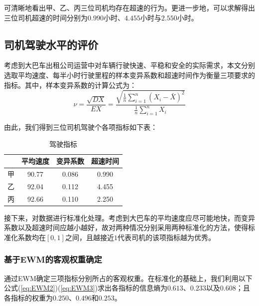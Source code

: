 \documentclass[bwprint]{cumcmthesis}
\begin{document}
        可清晰地看出甲、乙、丙三位司机均存在超速的行为。更进一步地，可以求解得出三位司机超速的时间分别为$0.990$小时、$4.455$小时与$2.550$小时。

        \subsection{司机驾驶水平的评价}
        考虑到大巴车出租公司运营中对车辆行驶快速、平稳和安全的实际需求，本文分别选取平均速度、每半小时行驶里程的样本变异系数和超速时间作为衡量三项要求的指标。其中，样本变异系数的计算公式为：
        \begin{equation*}
            \nu = \frac{\sqrt{DX}}{EX} = \frac{\sqrt{\frac{1}{n}\sum_{i=1}^{n}\left(X_i-\bar{X}\right)^2}}{\frac{1}{n}\sum_{i=1}^{n}X_i}
        \end{equation*}

        由此，我们得到三位司机驾驶个各项指标如下表：
        
        \begin{table}[htbp]
            \centering
            \caption{驾驶指标}
                \begin{tabular}{|c|c|c|c|}
                \hline
                & 平均速度 & 变异系数 & 超速时间 \\
                \hline
                甲     & 90.77 & 0.086 & 0.990 \\
                \hline
                乙     & 92.04 & 0.112 & 4.455 \\
                \hline
                丙     & 92.66 & 0.110 & 2.250 \\
                \hline
                \end{tabular}
            \label{tab:seven}
          \end{table}

        接下来，对数据进行标准化处理。考虑到大巴车的平均速度应尽可能地快，而变异系数以及超速时间应越小越好，故对两种情况分别采用两种标准化的方法，使得标准化系数均在$[0,1]$之间，且越接近$1$代表司机的该项指标越为优秀。

            \subsubsection{基于EWM的客观权重确定}
            通过EWM确定三项指标分别所占的客观权重。在标准化的基础上，我们利用以下公式(\ref{eq:EWM2})(\ref{eq:EWM3})求出各指标的信息熵为$0.613$、$0.233$以及$0.608$；且各指标的权重为$0.250$、$0.496$和$0.253$。
\end{document}
